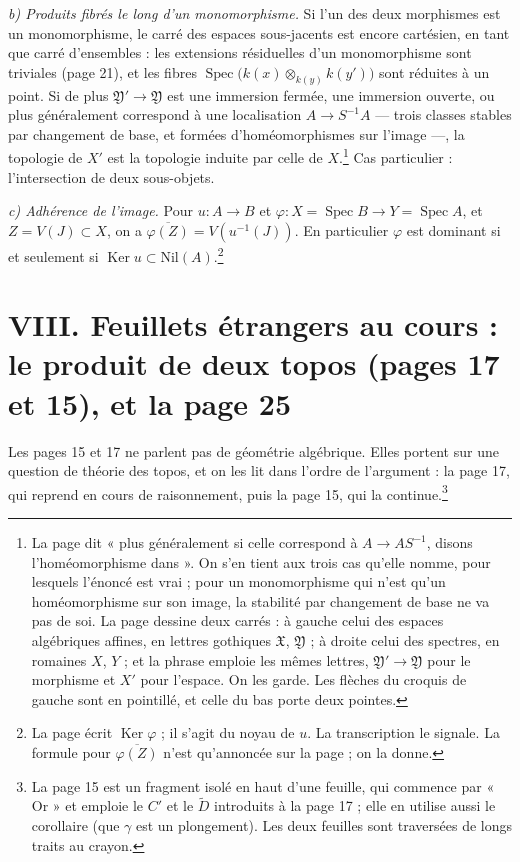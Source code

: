 \documentclass[11pt,a4paper]{article}
\begin{document}
\emph{b) Produits fibrés le long d'un monomorphisme.} Si l'un des deux
morphismes est un monomorphisme, le carré des espaces sous-jacents est encore
cartésien, en tant que carré d'ensembles : les extensions résiduelles d'un
monomorphisme sont triviales (page 21), et les fibres
$\operatorname{Spec}\bigl(k(x) \otimes_{k(y)} k(y')\bigr)$ sont réduites à un
point. Si de plus $\mathfrak{Y}' \to \mathfrak{Y}$ est une immersion fermée, une
immersion ouverte, ou plus généralement correspond à une localisation
$A \to S^{-1}A$ --- trois classes stables par changement de base, et formées
d'homéomorphismes sur l'image ---, la topologie de $X'$ est la topologie induite
par celle de $X$.\footnote{La page dit « plus généralement si celle correspond à
$A \to A S^{-1}$, disons l'homéomorphisme dans ». On s'en tient aux trois cas
qu'elle nomme, pour lesquels l'énoncé est vrai ; pour un monomorphisme qui n'est
qu'un homéomorphisme sur son image, la stabilité par changement de base ne va
pas de soi. La page dessine deux carrés : à gauche celui des espaces
algébriques affines, en lettres gothiques $\mathfrak{X}$, $\mathfrak{Y}$ ; à
droite celui des spectres, en romaines $X$, $Y$ ; et la phrase emploie les
mêmes lettres, $\mathfrak{Y}' \to \mathfrak{Y}$ pour le morphisme et $X'$ pour
l'espace. On les garde. Les flèches du croquis de gauche sont en pointillé, et
celle du bas porte deux pointes.} Cas particulier : l'intersection de deux sous-objets.

\emph{c) Adhérence de l'image.} Pour $u : A \to B$ et
$\varphi : X = \operatorname{Spec} B \to Y = \operatorname{Spec} A$, et
$Z = V(J) \subset X$, on a $\overline{\varphi(Z)} = V(u^{-1}(J))$. En
particulier $\varphi$ est dominant si et seulement si
$\operatorname{Ker} u \subset \mathrm{Nil}(A)$.\footnote{La page écrit
$\operatorname{Ker} \varphi$ ; il s'agit du noyau de $u$. La transcription le
signale. La formule pour $\overline{\varphi(Z)}$ n'est qu'annoncée sur la page ;
on la donne.}

\section*{VIII. Feuillets étrangers au cours : le produit de deux topos (pages 17 et 15), et la page 25}

Les pages 15 et 17 ne parlent pas de géométrie algébrique. Elles portent sur une
question de théorie des topos, et on les lit dans l'ordre de l'argument : la page
17, qui reprend en cours de raisonnement, puis la page 15, qui la
continue.\footnote{La page 15 est un fragment isolé en haut d'une feuille, qui
commence par « Or » et emploie le $C'$ et le $\widetilde{D}$ introduits à la
page 17 ; elle en utilise aussi le corollaire (que $\gamma$ est un plongement).
Les deux feuilles sont traversées de longs traits au crayon.}
\end{document}
